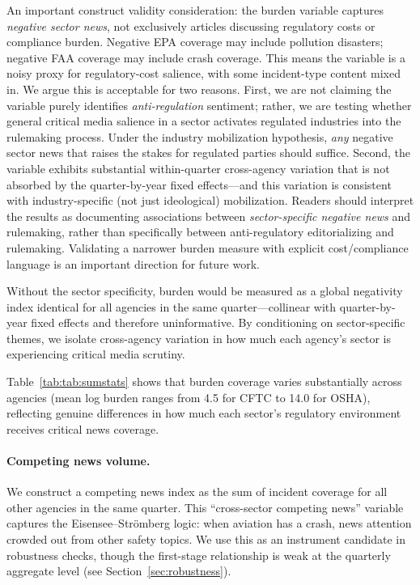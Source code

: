 \documentclass[12pt]{article}
\begin{document}
An important construct validity consideration: the burden variable captures \emph{negative sector news}, not exclusively articles discussing regulatory costs or compliance burden. Negative EPA coverage may include pollution disasters; negative FAA coverage may include crash coverage. This means the variable is a noisy proxy for regulatory-cost salience, with some incident-type content mixed in. We argue this is acceptable for two reasons. First, we are not claiming the variable purely identifies \emph{anti-regulation} sentiment; rather, we are testing whether general critical media salience in a sector activates regulated industries into the rulemaking process. Under the industry mobilization hypothesis, \emph{any} negative sector news that raises the stakes for regulated parties should suffice. Second, the variable exhibits substantial within-quarter cross-agency variation that is not absorbed by the quarter-by-year fixed effects---and this variation is consistent with industry-specific (not just ideological) mobilization. Readers should interpret the results as documenting associations between \emph{sector-specific negative news} and rulemaking, rather than specifically between anti-regulatory editorializing and rulemaking. Validating a narrower burden measure with explicit cost/compliance language is an important direction for future work.

Without the sector specificity, burden would be measured as a global negativity index identical for all agencies in the same quarter---collinear with quarter-by-year fixed effects and therefore uninformative. By conditioning on sector-specific themes, we isolate cross-agency variation in how much each agency's sector is experiencing critical media scrutiny.

Table~\ref{tab:tab:sumstats} shows that burden coverage varies substantially across agencies (mean log burden ranges from 4.5 for CFTC to 14.0 for OSHA), reflecting genuine differences in how much each sector's regulatory environment receives critical news coverage.

\paragraph{Competing news volume.} We construct a competing news index as the sum of incident coverage for all other agencies in the same quarter. This ``cross-sector competing news'' variable captures the Eisensee--Str{\"o}mberg \citeyearpar{eisensee2007news} logic: when aviation has a crash, news attention crowded out from other safety topics. We use this as an instrument candidate in robustness checks, though the first-stage relationship is weak at the quarterly aggregate level (see Section~\ref{sec:robustness}).
\end{document}
